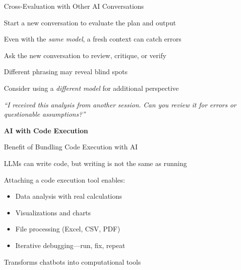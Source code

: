 \documentclass[aspectratio=169]{beamer}
\begin{document}
\begin{frame}{Cross-Evaluation with Other AI Conversations}
\begin{baritemize}
  \item Start a \alert{new conversation} to evaluate the plan and output
  \item Even with the \textit{same model}, a fresh context can catch errors
  \item Ask the new conversation to review, critique, or verify
  \item Different phrasing may reveal blind spots
  \item Consider using a \textit{different model} for additional perspective
\end{baritemize}

\vspace{0.3cm}
\begin{shadedbox}
\textit{``I received this analysis from another session. Can you review it for errors or questionable assumptions?''}
\end{shadedbox}
\end{frame}



\begin{frame}[plain]
\vfill
\begin{center}
{\fontsize{26}{30}\selectfont\bfseries\color{titlegray} AI with Code Execution}
\end{center}
\vfill
\end{frame}

\begin{frame}{Benefit of Bundling Code Execution with AI}
\begin{baritemize}
  \item LLMs can write code, but writing is not the same as running
  \item Attaching a code execution tool enables:
  \begin{itemize}
    \item Data analysis with real calculations
    \item Visualizations and charts
    \item File processing (Excel, CSV, PDF)
    \item \alert{Iterative debugging---run, fix, repeat}
  \end{itemize}
  \item Transforms chatbots into computational tools
\end{baritemize}
\end{frame}
\end{document}
